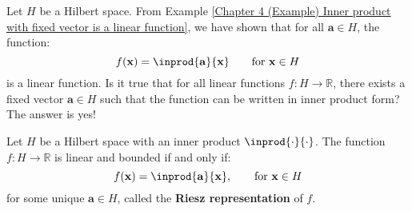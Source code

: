\documentclass{huhtakm-template-book-v2}
\begin{document}
    Let $H$ be a Hilbert space. From Example \ref{Chapter 4 (Example) Inner product with fixed vector is a linear function}, we have shown that for all $\mathbf{a}\in H$, the function:
    \begin{equation*}
        f(\mathbf{x})=\inprod{\mathbf{a}}{\mathbf{x}} \qquad \text{for } \mathbf{x}\in H
    \end{equation*}
    is a linear function. Is it true that for all linear functions $f:H\to\mathbb{R}$, there exists a fixed vector $\mathbf{a}\in H$ such that the function can be written in inner product form? The answer is yes!
    \begin{thm}
        Let $H$ be a Hilbert space with an inner product $\inprod{\cdot}{\cdot}$. The function $f:H\to\mathbb{R}$ is linear and bounded if and only if:
        \begin{equation*}
            f(\mathbf{x})=\inprod{\mathbf{a}}{\mathbf{x}}, \qquad \text{for } \mathbf{x}\in H
        \end{equation*}
        for some unique $\mathbf{a}\in H$, called the \textbf{Riesz representation} of $f$.
    \end{thm}
\end{document}
